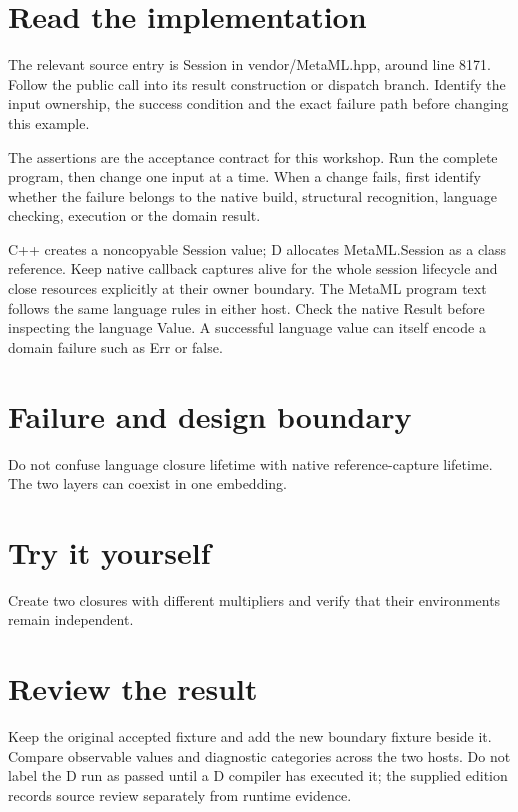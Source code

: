 \section*{Read the implementation}
The relevant source entry is Session in vendor/MetaML.hpp, around line 8171. Follow the public call into its result construction or dispatch branch. Identify the input ownership, the success condition and the exact failure path before changing this example.

The assertions are the acceptance contract for this workshop. Run the complete program, then change one input at a time. When a change fails, first identify whether the failure belongs to the native build, structural recognition, language checking, execution or the domain result.

\clearpage
{}
C++ creates a noncopyable Session value; D allocates MetaML.Session as a class reference. Keep native callback captures alive for the whole session lifecycle and close resources explicitly at their owner boundary. The MetaML program text follows the same language rules in either host. Check the native Result before inspecting the language Value. A successful language value can itself encode a domain failure such as Err or false.


\section*{Failure and design boundary}
Do not confuse language closure lifetime with native reference-capture lifetime. The two layers can coexist in one embedding.

\section*{Try it yourself}
Create two closures with different multipliers and verify that their environments remain independent.

\section*{Review the result}
Keep the original accepted fixture and add the new boundary fixture beside it. Compare observable values and diagnostic categories across the two hosts. Do not label the D run as passed until a D compiler has executed it; the supplied edition records source review separately from runtime evidence.

